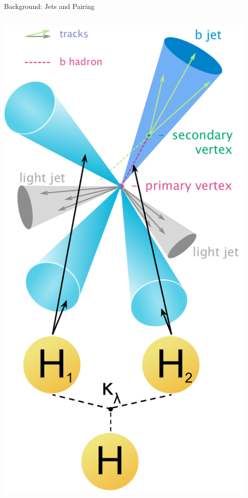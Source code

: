 \documentclass[10pt, aspectratio=169]{beamer}
\begin{document}
{\begin{frame}{Background: Jets and Pairing}
\begin{columns}[onlytextwidth]
\begin{column}{0.25\textwidth}
      \includegraphics[width=\linewidth]{images/jets_and_pairing.png}
    \end{column}
​  \end{columns}
\end{frame}
}
\end{document}
